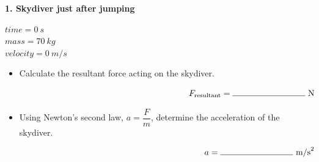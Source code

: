 \documentclass[12pt]{article}
\begin{document}
\noindent
\begin{minipage}[t]{0.48\textwidth}

\textbf{1. Skydiver just after jumping}

\vspace{0.5cm}
$time = \SI{0}{s}$ \\
$mass = \SI{70}{kg}$ \\
$velocity = \SI{0}{m/s}$ \\

\vspace{0.5cm}

\begin{center}
\end{center}

\end{minipage}
\hfill
\begin{minipage}[t]{0.48\textwidth}

\begin{itemize}[label={}, leftmargin=*]
    \item Calculate the resultant force acting on the skydiver.

    \vspace{2.0cm}
    \[
    \makebox[\linewidth][r]{$F_{\text{resultant}} = \rule{3cm}{0.4pt}\ \text{N}$}
    \]

    \item Using Newton’s second law, $a = \dfrac{F}{m}$, determine the acceleration of the skydiver.

    \vspace{2.0cm}
    \[
    \makebox[\linewidth][r]{$a = \rule{3cm}{0.4pt}\ \text{m/s}^{2}$}
    \]
\end{itemize}

\end{minipage}

\vspace{1.2cm}
\end{document}
